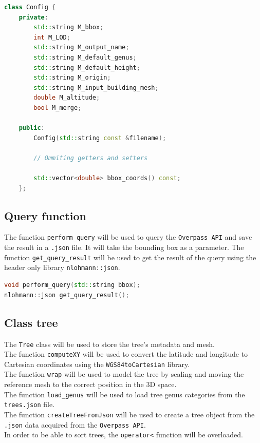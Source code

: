 \documentclass[12pt]{article}
\begin{document}
\begin{lstlisting}[language=C++]
class Config {
    private:
        std::string M_bbox;
        int M_LOD;
        std::string M_output_name;
        std::string M_default_genus;
        std::string M_default_height;
        std::string M_origin;
        std::string M_input_building_mesh;
        double M_altitude;
        bool M_merge;

    public:
        Config(std::string const &filename);

        // Ommiting getters and setters

        std::vector<double> bbox_coords() const;
    };

\end{lstlisting}

\subsection{Query function}

The function \texttt{perform\_query} will be used to query the \texttt{Overpass API}
and save the result in a \texttt{.json} file. It will take the bounding box as a
parameter.
The function \texttt{get\_query\_result} will be used to get the result of the query
using the header only library \texttt{nlohmann::json}.

\begin{lstlisting}[language=C++]
void perform_query(std::string bbox);
nlohmann::json get_query_result();
\end{lstlisting}

\subsection{Class tree}

The \texttt{Tree} class will be used to store the tree's metadata and mesh. \\
The function \texttt{computeXY} will be used to convert the latitude and longitude
to Cartesian coordinates using the \texttt{WGS84toCartesian} library. \\
The function \texttt{wrap} will be used to model the tree by scaling and moving
the reference mesh to the correct position in the 3D space. \\
The function \texttt{load\_genus} will be used to load tree genus categories from
the \texttt{trees.json} file. \\
The function \texttt{createTreeFromJson} will be used to create a tree object from
the \texttt{.json} data acquired from the \texttt{Overpass API}. \\
In order to be able to sort trees, the \texttt{operator<} function will be overloaded.
\end{document}
